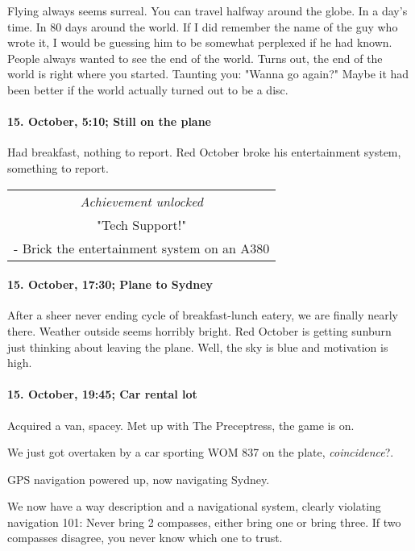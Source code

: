 Flying always seems surreal.
You can travel halfway around the globe.
In a day's time.
In 80 days around the world.
If I did remember the name of the guy who wrote it, I would be guessing him to be somewhat perplexed if he had known.
People always wanted to see the end of the world.
Turns out, the end of the world is right where you started.
Taunting you: "Wanna go again?"
Maybe it had been better if the world actually turned out to be a disc.

\paragraph{15. October, 5:10; Still on the plane}
Had breakfast, nothing to report.
Red October broke his entertainment system, something to report.

\begin{center}
\begin{tabular}{||c||}
\emph{Achievement unlocked}\\
"Tech Support!"\\
\multicolumn{1}{||p{0.8\textwidth}||}{\footnotesize - Brick the entertainment system on an A380} \\
\end{tabular}
\end{center}

\paragraph{15. October, 17:30; Plane to Sydney}
After a sheer never ending cycle of breakfast-lunch eatery, we are finally nearly there.
Weather outside seems horribly bright.
Red October is getting sunburn just thinking about leaving the plane.
Well, the sky is blue and motivation is high.

\paragraph{15. October, 19:45; Car rental lot}
Acquired a van, spacey.
Met up with The Preceptress, the game is on.

We just got overtaken by a car sporting WOM 837 on the plate, \emph{coincidence}?.

GPS navigation powered up, now navigating Sydney.

We now have a way description and a navigational system, clearly violating navigation 101: Never bring 2 compasses, either bring one or bring three.
If two compasses disagree, you never know which one to trust.

